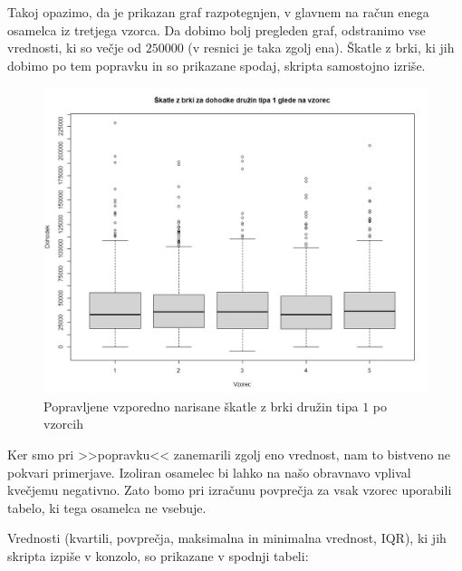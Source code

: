 \documentclass[a4paper, 10pt]{article}
\begin{document}
	Takoj opazimo, da je prikazan graf razpotegnjen, v glavnem na račun enega osamelca iz tretjega vzorca. Da dobimo bolj pregleden graf, odstranimo vse vrednosti, ki so večje od $250000$ (v resnici je taka zgolj ena). Škatle z brki, ki jih dobimo po tem popravku in so prikazane spodaj, skripta samostojno izriše.
	\newpage
	\begin{figure}[h!]
		\label{fig: boxplotB2}
		\centering
		\includegraphics[scale = 0.4]{LepseSkatlezbrkiB}
		\caption{Popravljene vzporedno narisane škatle z brki družin tipa $1$ po vzorcih}
	\end{figure}
	
	Ker smo pri >>popravku<< zanemarili zgolj eno vrednost, nam to bistveno ne pokvari primerjave. Izoliran osamelec bi lahko na našo obravnavo vplival kvečjemu negativno. Zato bomo pri izračunu povprečja za vsak vzorec uporabili tabelo, ki tega osamelca ne vsebuje.
	
	Vrednosti (kvartili, povprečja, maksimalna in minimalna vrednost, IQR), ki jih skripta izpiše v konzolo, so prikazane v spodnji tabeli:
	
\end{document}
